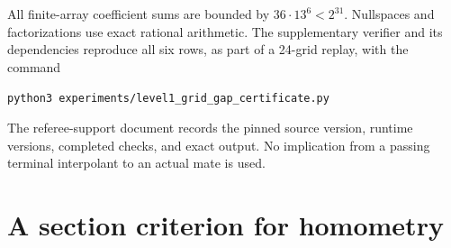 \documentclass[11pt]{article}
\numberwithin{equation}{section}
\theoremstyle{definition}
\theoremstyle{remark}
\begin{document}
All finite-array coefficient sums are bounded by
\(36\cdot13^6<2^{31}\). Nullspaces and factorizations use exact
rational arithmetic. The supplementary verifier and its dependencies
reproduce all six rows, as part of a 24-grid replay, with the command
\begin{center}
\small\texttt{python3 experiments/level1\_grid\_gap\_certificate.py}
\end{center}
The referee-support document records the pinned source version, runtime
versions, completed checks, and exact output. No implication from a
passing terminal interpolant to an actual mate is used.



\section{A section criterion for homometry}\label{vi:sec:reduce}
\end{document}
